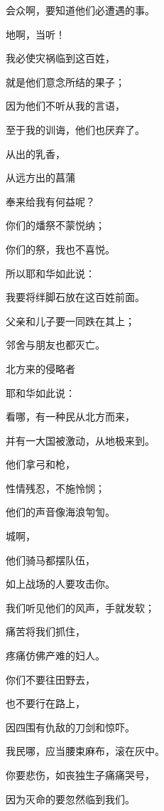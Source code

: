 {\par }{\Q 会众啊，要知道他们必遭遇的事。
\par }{\Q {}地啊，当听！
\par }{\Q 我必使灾祸临到这百姓，
\par }{\Q 就是他们意念所结的果子；
\par }{\Q 因为他们不听从我的言语，
\par }{\Q 至于我的训诲，他们也厌弃了。
\par }{\Q {}从{}出的乳香，
\par }{\Q 从远方出的菖蒲
\par }{\Q 奉来给我有何益呢？
\par }{\Q 你们的燔祭不蒙悦纳；
\par }{\Q 你们的{}祭，我也不喜悦。
\par }{\Q {}所以耶和华如此说：
\par }{\Q 我要将绊脚石放在这百姓前面。
\par }{\Q 父亲和儿子要一同跌在其上；
\par }{\Q 邻舍与朋友也都灭亡。
\par }{\SH 北方来的侵略者
\par }{\Q {}耶和华如此说：
\par }{\Q 看哪，有一种民从北方而来，
\par }{\Q 并有一大国被激动，从地极来到。
\par }{\Q {}他们拿弓和枪，
\par }{\Q 性情残忍，不施怜悯；
\par }{\Q 他们的声音像海浪匉訇。
\par }{城啊，
\par }{\Q 他们骑马都摆队伍，
\par }{\Q 如上战场的人要攻击你。
\par }{\Q {}我们听见他们的风声，手就发软；
\par }{\Q 痛苦将我们抓住，
\par }{\Q 疼痛仿佛产难的妇人。
\par }{\Q {}你们不要往田野去，
\par }{\Q 也不要行在路上，
\par }{\Q 因四围有仇敌的刀剑和惊吓。
\par }{\Q {}我民哪，应当腰束麻布，滚在灰中。
\par }{\Q 你要悲伤，如丧独生子痛痛哭号，
\par }{\Q 因为灭命的要忽然临到我们。
}
